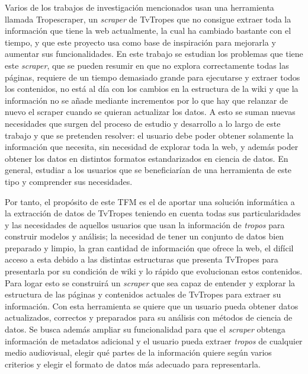 Varios de los trabajos de investigación mencionados usan una herramienta llamada
Tropescraper, un \textit{scraper} de TvTropes que no consigue extraer toda la
información que tiene la web actualmente, la cual ha cambiado bastante con el
tiempo, y que este proyecto usa como base de inspiración para mejorarla y
aumentar sus funcionalidades. En este trabajo se estudian los problemas que
tiene este \textit{scraper}, que se pueden resumir en que no explora
correctamente todas las páginas, requiere de un tiempo demasiado grande para
ejecutarse y extraer todos los contenidos, no está al día con los cambios en la
estructura de la wiki y que la información no se añade mediante incrementos por
lo que hay que relanzar de nuevo el scraper cuando se quieran actualizar los
datos. A esto se suman nuevas necesidades que surgen del proceso de estudio y
desarrollo a lo largo de este trabajo y que se pretenden resolver: el usuario
debe poder obtener solamente la información que necesita, sin necesidad de
explorar toda la web, y además poder obtener los datos en distintos formatos
estandarizados en ciencia de datos. En general, estudiar a los usuarios que se
beneficiarían de una herramienta de este tipo y comprender sus necesidades.

Por tanto, el propósito de este TFM es el de aportar una solución informática a
la extracción de datos de TvTropes teniendo en cuenta todas sus particularidades
y las necesidades de aquellos usuarios que usan la información de
\textit{tropos} para construir modelos y análisis; la necesidad de tener un
conjunto de datos bien preparado y limpio, la gran cantidad de información que
ofrece la web, el difícil acceso a esta debido a las distintas estructuras que
presenta TvTropes para presentarla por su condición de wiki y lo rápido que
evolucionan estos contenidos. Para logar esto se construirá un \textit{scraper}
que sea capaz de entender y explorar la estructura de las páginas y contenidos
actuales de TvTropes para extraer su información. Con esta herramienta se quiere
que un usuario pueda obtener datos actualizados, correctos y preparados para su
análisis con métodos de ciencia de datos. Se busca además ampliar su
funcionalidad para que el \textit{scraper} obtenga información de metadatos
adicional y el usuario pueda extraer \textit{tropos} de cualquier medio
audiovisual, elegir qué partes de la información quiere según varios criterios y
elegir el formato de datos más adecuado para representarla.

